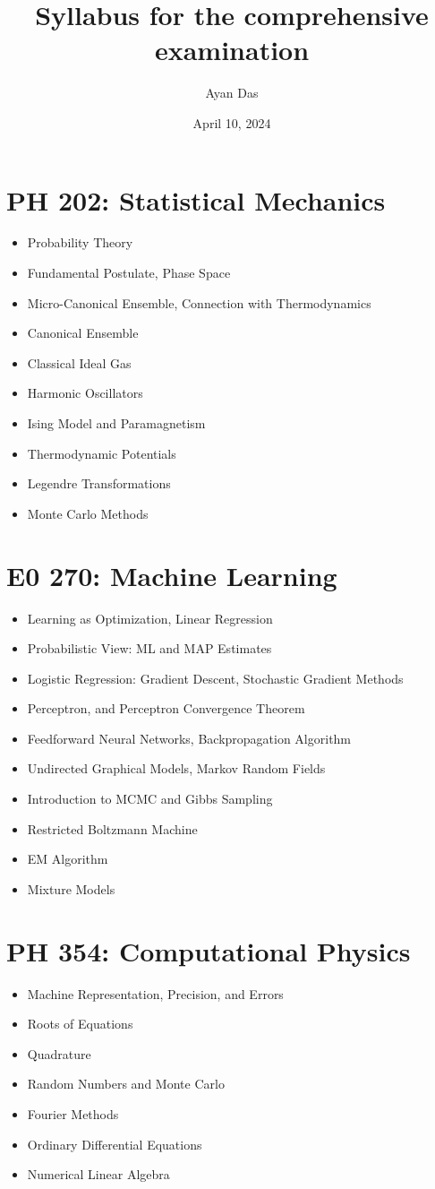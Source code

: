 \documentclass[11pt]{article}
\author{Ayan Das}
\date{April 10, 2024}
\title{Syllabus for the comprehensive examination}
\begin{document}
\maketitle
\section{PH 202: Statistical Mechanics}
\label{sec:orge79ea67}
\begin{itemize}
\item Probability Theory
\item Fundamental Postulate, Phase Space
\item Micro-Canonical Ensemble, Connection with Thermodynamics
\item Canonical Ensemble
\item Classical Ideal Gas
\item Harmonic Oscillators
\item Ising Model and Paramagnetism
\item Thermodynamic Potentials
\item Legendre Transformations
\item Monte Carlo Methods
\end{itemize}
\section{E0 270: Machine Learning}
\label{sec:org5edc16d}
\begin{itemize}
\item Learning as Optimization, Linear Regression
\item Probabilistic View: ML and MAP Estimates
\item Logistic Regression: Gradient Descent, Stochastic Gradient Methods
\item Perceptron, and Perceptron Convergence Theorem
\item Feedforward Neural Networks, Backpropagation Algorithm
\item Undirected Graphical Models, Markov Random Fields
\item Introduction to MCMC and Gibbs Sampling
\item Restricted Boltzmann Machine
\item EM Algorithm
\item Mixture Models
\end{itemize}
\section{PH 354: Computational Physics}
\label{sec:orgcac521e}
\begin{itemize}
\item Machine Representation, Precision, and Errors
\item Roots of Equations
\item Quadrature
\item Random Numbers and Monte Carlo
\item Fourier Methods
\item Ordinary Differential Equations
\item Numerical Linear Algebra
\end{itemize}
\end{document}
